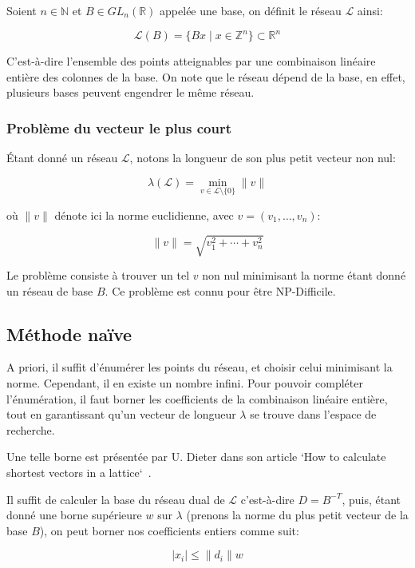 \documentclass{article}
\begin{document}
Soient $n \in \mathbb{N}$ et $B \in GL_n(\mathbb{R})$ appelée une base, on définit le réseau $\mathcal{L}$ ainsi:

\[
    \mathcal{L}(B) = \{ Bx \mid x \in \mathbb{Z}^n \} \subset \mathbb{R}^n
\]

C'est-à-dire l'ensemble des points atteignables par une combinaison linéaire entière des colonnes de la base. On note que le réseau dépend de la base, en effet, plusieurs bases peuvent engendrer le même réseau.

\subsubsection{Problème du vecteur le plus court}

Étant donné un réseau $\mathcal{L}$, notons la longueur de son plus petit vecteur non nul:

\[
    \lambda(\mathcal{L}) = \min_{v \in \mathcal{L} \setminus \{0\}} { \lVert v \rVert }
\]

où $\lVert v \rVert$ dénote ici la norme euclidienne, avec $v = (v_1, \dots, v_n)$:

\[
    \lVert v \rVert = \sqrt{v_1^2 + \cdots + v_n^2}
\]

Le problème consiste à trouver un tel $v$ non nul minimisant la norme étant donné un réseau de base $B$. Ce problème est connu pour être NP-Difficile.

\subsection{Méthode naïve}

A priori, il suffit d'énumérer les points du réseau, et choisir celui minimisant la norme. Cependant, il en existe un nombre infini. Pour pouvoir compléter l'énumération, il faut borner les coefficients de la combinaison linéaire entière, tout en garantissant qu'un vecteur de longueur $\lambda$ se trouve dans l'espace de recherche.

Une telle borne est présentée par U. Dieter dans son article `How to calculate shortest vectors in a lattice`~\cite{b5abc078-0e9e-3e07-8735-c25285050362}.

Il suffit de calculer la base du réseau dual de $\mathcal{L}$ c'est-à-dire $D = B^{-T}$, puis, étant donné une borne supérieure $w$ sur $\lambda$ (prenons la norme du plus petit vecteur de la base $B$), on peut borner nos coefficients entiers comme suit:

\[
    |x_i| \leq \lVert d_i \rVert w
\]
\end{document}
